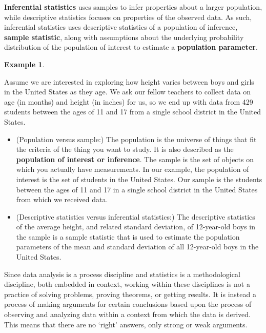 \documentclass[
]{book}
\theoremstyle{definition}
\theoremstyle{definition}
\newtheorem{example}{Example}[chapter]
\theoremstyle{definition}
\theoremstyle{definition}
\theoremstyle{remark}
\begin{document}
\textbf{Inferential statistics} uses samples to infer properties about a larger population, while descriptive statistics focuses on properties of the observed data. As such, inferential statistics uses descriptive statistics of a population of inference, \textbf{sample statistic}, along with assumptions about the underlying probability distribution of the population of interest to estimate a \textbf{population parameter}.

\begin{example}
\protect\hypertarget{exm:unlabeled-div-289}{}\label{exm:unlabeled-div-289}

Assume we are interested in exploring how height varies between boys and girls in the United States as they age. We ask our fellow teachers to collect data on age (in months) and height (in inches) for us, so we end up with data from 429 students between the ages of 11 and 17 from a single school district in the United States.

\begin{itemize}
\item
  (Population versus sample:) The population is the universe of things that fit the criteria of the thing you want to study. It is also described as the \textbf{population of interest or inference}. The sample is the set of objects on which you actually have measurements. In our example, the population of interest is the set of students in the United States. Our sample is the students between the ages of 11 and 17 in a single school district in the United States from which we received data.
\item
  (Descriptive statistics versus inferential statistics:) The descriptive statistics of the average height, and related standard deviation, of 12-year-old boys in the sample is a sample statistic that is used to estimate the population parameters of the mean and standard deviation of all 12-year-old boys in the United States.
\end{itemize}

\end{example}

Since data analysis is a process discipline and statistics is a methodological discipline, both embedded in context, working within these disciplines is not a practice of solving problems, proving theorems, or getting results. It is instead a process of making arguments for certain conclusions based upon the process of observing and analyzing data within a context from which the data is derived. This means that there are no `right' answers, only strong or weak arguments.
\end{document}
